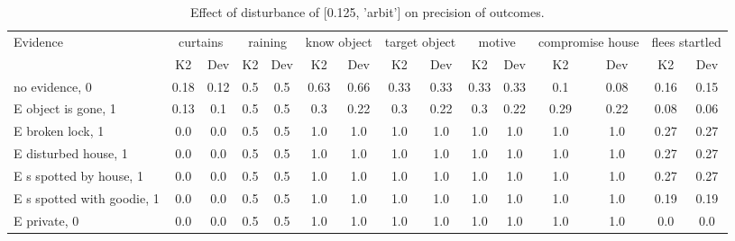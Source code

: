 \begin{table}\begin{tabular}{l|cc|cc|cc|cc|cc|cc|cc}\toprule\multirow{2}{*}{Evidence} & \multicolumn{2}{c}{curtains}& \multicolumn{2}{c}{raining}& \multicolumn{2}{c}{know object}& \multicolumn{2}{c}{target object}& \multicolumn{2}{c}{motive}& \multicolumn{2}{c}{compromise house}& \multicolumn{2}{c}{flees startled}\\& {K2} & {Dev}& {K2} & {Dev}& {K2} & {Dev}& {K2} & {Dev}& {K2} & {Dev}& {K2} & {Dev}& {K2} & {Dev}\\\midrule
no evidence, 0 & \cellcolor{Bittersweet}0.18&\cellcolor{Bittersweet}0.12&0.5&0.5&0.63&0.66&0.33&0.33&0.33&0.33&0.1&0.08&0.16&0.15\\E object is gone, 1 & 0.13&0.1&0.5&0.5&\cellcolor{Bittersweet}0.3&\cellcolor{Bittersweet}0.22&\cellcolor{Bittersweet}0.3&\cellcolor{Bittersweet}0.22&\cellcolor{Bittersweet}0.3&\cellcolor{Bittersweet}0.22&\cellcolor{Bittersweet}0.29&\cellcolor{Bittersweet}0.22&0.08&0.06\\E broken lock, 1 & 0.0&0.0&0.5&0.5&1.0&1.0&1.0&1.0&1.0&1.0&1.0&1.0&0.27&0.27\\E disturbed house, 1 & 0.0&0.0&0.5&0.5&1.0&1.0&1.0&1.0&1.0&1.0&1.0&1.0&0.27&0.27\\E s spotted by house, 1 & 0.0&0.0&0.5&0.5&1.0&1.0&1.0&1.0&1.0&1.0&1.0&1.0&0.27&0.27\\E s spotted with goodie, 1 & 0.0&0.0&0.5&0.5&1.0&1.0&1.0&1.0&1.0&1.0&1.0&1.0&0.19&0.19\\E private, 0 & 0.0&0.0&0.5&0.5&1.0&1.0&1.0&1.0&1.0&1.0&1.0&1.0&0.0&0.0\\\bottomrule\end{tabular}\caption{Effect of disturbance of [0.125, 'arbit'] on precision of outcomes.}\end{table}